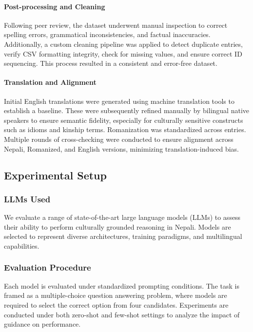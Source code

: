 \documentclass[10pt, a4paper]{article}
\begin{document}
\paragraph{Post-processing and Cleaning}
Following peer review, the dataset underwent manual inspection to correct spelling errors, grammatical inconsistencies, and factual inaccuracies. Additionally, a custom cleaning pipeline was applied to detect duplicate entries, verify CSV formatting integrity, check for missing values, and ensure correct ID sequencing. This process resulted in a consistent and error-free dataset.

\paragraph{Translation and Alignment}
Initial English translations were generated using machine translation tools to establish a baseline. These were subsequently refined manually by bilingual native speakers to ensure semantic fidelity, especially for culturally sensitive constructs such as idioms and kinship terms. Romanization was standardized across entries. Multiple rounds of cross-checking were conducted to ensure alignment across Nepali, Romanized, and English versions, minimizing translation-induced bias.

\subsection{Experimental Setup}

\subsubsection{LLMs Used}
We evaluate a range of state-of-the-art large language models (LLMs) to assess their ability to perform culturally grounded reasoning in Nepali. Models are selected to represent diverse architectures, training paradigms, and multilingual capabilities.

\subsubsection{Evaluation Procedure}
Each model is evaluated under standardized prompting conditions. The task is framed as a multiple-choice question answering problem, where models are required to select the correct option from four candidates. Experiments are conducted under both zero-shot and few-shot settings to analyze the impact of guidance on performance.
\end{document}
